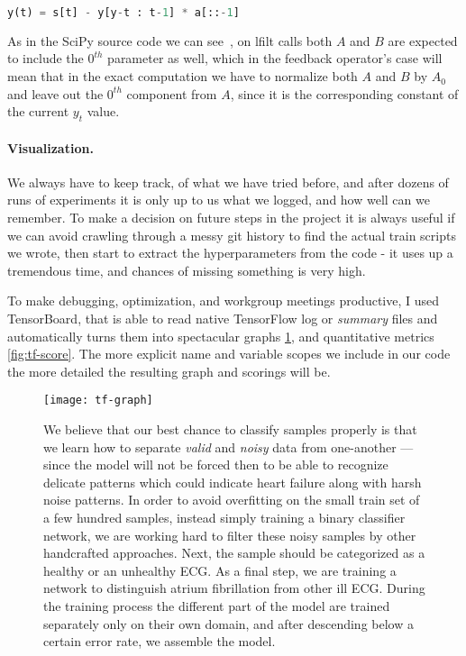 \begin{lstlisting}[language=Python]
y(t) = s[t] - y[y-t : t-1] * a[::-1]
\end{lstlisting}

As in the SciPy source code we can see~\cite{noauthor_scipy/scipy_nodate}, on lfilt calls both $A$ and $B$ are expected to include the $0^{th}$ parameter as well, which in the feedback operator's case will mean that in the exact computation we have to normalize both $A$ and $B$ by $A_0$ and leave out the $0^{th}$ component from $A$, since it is the corresponding constant of the current $y_t$ value.

\paragraph{Visualization.}
We always have to keep track, of what we have tried before, and after dozens of runs of experiments it is only up to us what we logged, and how well can we remember.
To make a decision on future steps in the project it is always useful if we can avoid crawling through a messy git history to find the actual train scripts we wrote, then start to extract the hyperparameters from the code - it uses up a tremendous time, and chances of missing something is very high.

To make debugging, optimization, and workgroup meetings productive, I used TensorBoard, that is able to read native TensorFlow log or \textit{summary} files and automatically turns them into spectacular graphs \ref{fig:tf-graph}, and quantitative metrics \ref{fig:tf-score}.
The more explicit name and variable scopes we include in our code the more detailed the resulting graph and scorings will be.

\begin{figure}[h]
  \centering
  \texttt{[image: tf-graph]}
  \caption{We believe that our best chance to classify samples properly is that we learn how to separate \textit{valid} and \textit{noisy} data from one-another --- since the model will not be forced then to be able to recognize delicate patterns which could indicate heart failure along with harsh noise patterns. In order to avoid overfitting on the small train set of a few hundred samples, instead simply training a binary classifier network, we are working hard to filter these noisy samples by other handcrafted approaches. Next, the sample should be categorized as a healthy or an unhealthy ECG. As a final step, we are training a network to distinguish atrium fibrillation from other ill ECG. During the training process the different part of the model are trained separately only on their own domain, and after descending below a certain error rate, we assemble the model.}
  \label{fig:tf-graph}
\end{figure}


